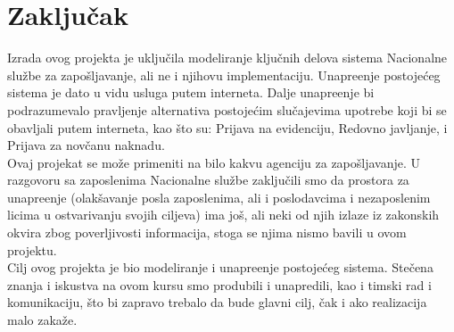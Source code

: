 \section{Zaklju\v cak}

Izrada ovog projekta je uklju\v cila modeliranje klju\v cnih delova sistema Nacionalne slu\v zbe za zapo\v sljavanje, ali ne i njihovu implementaciju. 
Unapre\dj enje postoje\' ceg sistema je dato u vidu usluga putem interneta. Dalje unapre\dj enje bi podrazumevalo pravljenje alternativa postoje\' cim slu\v cajevima upotrebe koji bi se obavljali putem interneta, kao \v sto su: Prijava na evidenciju, Redovno javljanje, i Prijava za nov\v canu naknadu.\\

Ovaj projekat se mo\v ze primeniti na bilo kakvu agenciju za zapo\v sljavanje.
U razgovoru sa zaposlenima Nacionalne slu\v zbe zaklju\v cili smo da prostora za unapre\dj enje (olak\v savanje posla zaposlenima, ali i poslodavcima i nezaposlenim licima u ostvarivanju svojih ciljeva) ima jo\v s, ali neki od njih izlaze iz zakonskih okvira zbog poverljivosti informacija, stoga se njima nismo bavili u ovom projektu.\\

Cilj ovog projekta je bio modeliranje i unapre\dj enje postoje\' ceg sistema. Ste\v cena znanja i iskustva na ovom kursu smo produbili i unapredili, kao i timski rad i komunikaciju, \v sto bi zapravo trebalo da bude glavni cilj, \v cak i ako realizacija malo zaka\v ze.
